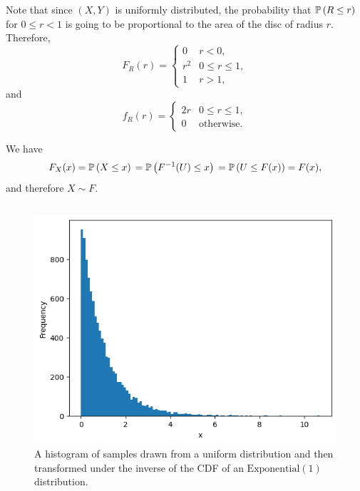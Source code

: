 \begin{ex}
  Note that since $(X,Y)$ is uniformly distributed, the probability that
  $\P{R\leq r}$ for $0\leq r<1$ is going to be proportional to the area of the
  disc of radius $r$. Therefore,
  \[
    F_R(r)=\begin{cases}
      0   & r < 0,          \\
      r^2 & 0\leq r \leq 1, \\
      1   & r > 1,
    \end{cases}
  \]
  and
  \[
    f_R(r)=\begin{cases}
      2r & 0\leq r \leq 1,   \\
      0  & \text{otherwise}.
    \end{cases}
  \]
\end{ex}

\begin{ex}
  We have
  \[
    F_X(x)
    =\P{X\leq x}         \\
    =\P{F^{-1}(U)\leq x} \\
    =\P{U\leq F(x)}
    =F(x),
  \]
  and therefore $X\sim F$.

  \inputminted{python}{../code/02-15.py}

  \begin{figure}[H]
    \centering
    \includegraphics[scale=1]{../images/02-15}
    \caption{A histogram of samples drawn from a uniform distribution and then
      transformed under the inverse of the CDF of an $\text{Exponential}(1)$
      distribution.}
  \end{figure}
\end{ex}

